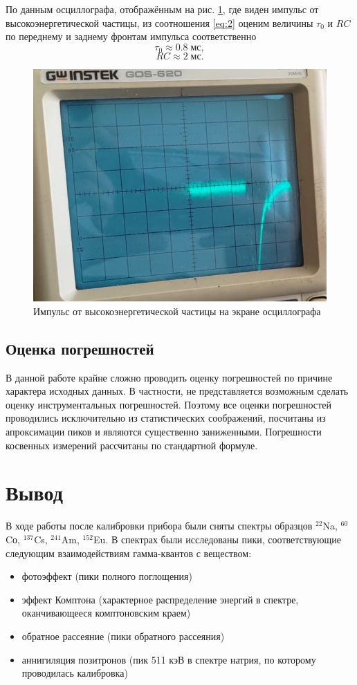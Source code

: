 \documentclass[a4paper]{article}
\begin{document}
По данным осциллографа, отображённым на рис. \ref{fig:screenshot2}, где виден импульс от высокоэнергетической частицы, из соотношения \eqref{eq:2} оценим величины $\tau_0$ и $ R C $ по переднему и заднему фронтам импульса соответственно
\[
	\tau_0\approx 0.8\; мс,
\]
\[
	R C \approx 2\; мс.
\]
\begin{figure}
	\centering
	\includegraphics[width=0.7\linewidth]{Screenshot_2}
	\caption{Импульс от высокоэнергетической частицы на экране осциллографа}
	\label{fig:screenshot2}
\end{figure}

 
\subsection{Оценка погрешностей}
В данной работе крайне сложно проводить оценку погрешностей по причине характера исходных данных. В частности, не представляется возможным сделать оценку инструментальных погрешностей. Поэтому все оценки погрешностей проводились исключительно из статистических соображений, посчитаны из апроксимации пиков и являются существенно заниженными. Погрешности косвенных измерений рассчитаны по стандартной формуле.

\section{Вывод}
В ходе работы после калибровки прибора были сняты спектры образцов $^{22}$Na,  $^{60}$Cо,  $^{137}$Cs, $^{241}$Am, $^{152}$Eu. В спектрах были исследованы пики, соответствующие следующим взаимодействиям гамма-квантов с веществом:
\begin{itemize}
	\item фотоэффект (пики полного поглощения)
	\item эффект Комптона (характерное распределение энергий в спектре, оканчивающееся комптоновским краем)
	\item обратное рассеяние (пики обратного рассеяния)
	\item аннигиляция позитронов (пик 511 кэВ в спектре натрия, по которому проводилась калибровка)
\end{itemize}
\end{document}
